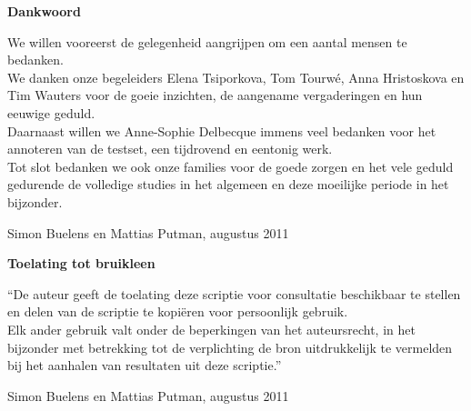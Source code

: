 
\newpage

\noindent \textbf{\huge Dankwoord}

\vspace{1.5cm}

\noindent
We willen vooreerst de gelegenheid aangrijpen om een aantal mensen te bedanken. 
\\

\noindent
We danken onze begeleiders Elena Tsiporkova, Tom Tourw\'e, Anna Hristoskova en Tim Wauters voor de goeie inzichten, de aangename vergaderingen en hun eeuwige geduld.
\\

\noindent
Daarnaast willen we Anne-Sophie Delbecque immens veel bedanken voor het annoteren van de testset, een tijdrovend en eentonig werk.
\\

\noindent
Tot slot bedanken we ook onze families voor de goede zorgen en het vele geduld gedurende de volledige studies in het algemeen en deze moeilijke periode in het bijzonder.

\vspace{1.5cm}

\noindent

\addvspace{4cm}

\noindent Simon Buelens en Mattias Putman, augustus 2011\newpage

\noindent \textbf{\huge Toelating tot bruikleen}

\vspace{1.5cm}

\noindent
``De auteur geeft de toelating deze scriptie voor consultatie beschikbaar
te stellen en delen van de scriptie te kopi\"eren voor persoonlijk
gebruik.\\
Elk ander gebruik valt onder de beperkingen van het auteursrecht,
in het bijzonder met betrekking tot de verplichting de bron uitdrukkelijk
te vermelden bij het aanhalen van resultaten uit deze scriptie.''

\addvspace{4cm}

\noindent Simon Buelens en Mattias Putman, augustus 2011\newpage
